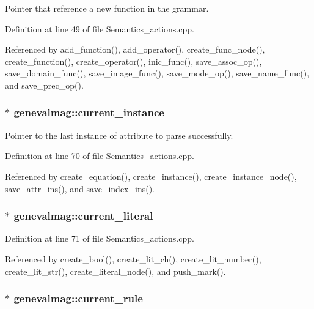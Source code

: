 Pointer that reference a new function in the grammar. 

Definition at line 49 of file Semantics\_\-actions.cpp.

Referenced by add\_\-function(), add\_\-operator(), create\_\-func\_\-node(), create\_\-function(), create\_\-operator(), inic\_\-func(), save\_\-assoc\_\-op(), save\_\-domain\_\-func(), save\_\-image\_\-func(), save\_\-mode\_\-op(), save\_\-name\_\-func(), and save\_\-prec\_\-op().\hypertarget{namespacegenevalmag_4e01071642cc57ba91fe84d929195c7c}{
\subsubsection[{current\_\-instance}]{$\ast$ {\bf genevalmag::current\_\-instance}}}
\label{namespacegenevalmag_4e01071642cc57ba91fe84d929195c7c}


Pointer to the last instance of attribute to parse successfully. 

Definition at line 70 of file Semantics\_\-actions.cpp.

Referenced by create\_\-equation(), create\_\-instance(), create\_\-instance\_\-node(), save\_\-attr\_\-ins(), and save\_\-index\_\-ins().\hypertarget{namespacegenevalmag_09a13d15a03643602e801cf36685ede0}{
\subsubsection[{current\_\-literal}]{$\ast$ {\bf genevalmag::current\_\-literal}}}
\label{namespacegenevalmag_09a13d15a03643602e801cf36685ede0}




Definition at line 71 of file Semantics\_\-actions.cpp.

Referenced by create\_\-bool(), create\_\-lit\_\-ch(), create\_\-lit\_\-number(), create\_\-lit\_\-str(), create\_\-literal\_\-node(), and push\_\-mark().\hypertarget{namespacegenevalmag_fc4896526f13792a5f56fa1c254759d4}{
\subsubsection[{current\_\-rule}]{$\ast$ {\bf genevalmag::current\_\-rule}}}
\label{namespacegenevalmag_fc4896526f13792a5f56fa1c254759d4}


